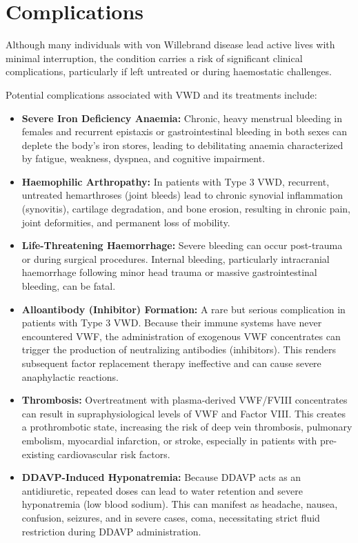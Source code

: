 \section*{Complications}
Although many individuals with von Willebrand disease lead active lives with minimal interruption, the condition carries a risk of significant clinical complications, particularly if left untreated or during haemostatic challenges.

Potential complications associated with VWD and its treatments include:
\begin{itemize}
    \item \textbf{Severe Iron Deficiency Anaemia:} Chronic, heavy menstrual bleeding in females and recurrent epistaxis or gastrointestinal bleeding in both sexes can deplete the body's iron stores, leading to debilitating anaemia characterized by fatigue, weakness, dyspnea, and cognitive impairment.
    \item \textbf{Haemophilic Arthropathy:} In patients with Type 3 VWD, recurrent, untreated hemarthroses (joint bleeds) lead to chronic synovial inflammation (synovitis), cartilage degradation, and bone erosion, resulting in chronic pain, joint deformities, and permanent loss of mobility.
    \item \textbf{Life-Threatening Haemorrhage:} Severe bleeding can occur post-trauma or during surgical procedures. Internal bleeding, particularly intracranial haemorrhage following minor head trauma or massive gastrointestinal bleeding, can be fatal.
    \item \textbf{Alloantibody (Inhibitor) Formation:} A rare but serious complication in patients with Type 3 VWD. Because their immune systems have never encountered VWF, the administration of exogenous VWF concentrates can trigger the production of neutralizing antibodies (inhibitors). This renders subsequent factor replacement therapy ineffective and can cause severe anaphylactic reactions.
    \item \textbf{Thrombosis:} Overtreatment with plasma-derived VWF/FVIII concentrates can result in supraphysiological levels of VWF and Factor VIII. This creates a prothrombotic state, increasing the risk of deep vein thrombosis, pulmonary embolism, myocardial infarction, or stroke, especially in patients with pre-existing cardiovascular risk factors.
    \item \textbf{DDAVP-Induced Hyponatremia:} Because DDAVP acts as an antidiuretic, repeated doses can lead to water retention and severe hyponatremia (low blood sodium). This can manifest as headache, nausea, confusion, seizures, and in severe cases, coma, necessitating strict fluid restriction during DDAVP administration.
\end{itemize}


